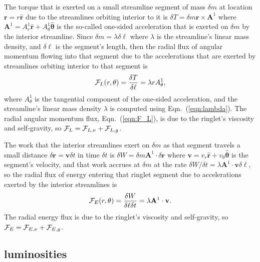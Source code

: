 \documentclass[preprint]{aastex62}
\begin{document}
The torque that is exerted on a small streamline segment of mass $\delta m$
at location $\mathbf{r}=r\hat{\mathbf{r}}$
due to the streamlines orbiting interior to it is $\delta T=\delta m\mathbf{r}\times\mathbf{A}^1$ where 
$\mathbf{A}^1=A^1_r\hat{\mathbf{r}} + A^1_\theta\hat{\boldsymbol\theta}$
is the so-called one-sided acceleration that is exerted on $\delta m$ by the interior streamline. 
Since $\delta m=\lambda\delta\ell$ where $\lambda$ is the streamline's linear mass density,
and $\delta\ell$ is the segment's length, then the radial flux of angular momentum flowing into
that segment due to the accelerations that are exerted by streamlines orbiting interior to that
segment is
\begin{equation}
    \label{eqn:F_L}
    {\cal F}_L(r, \theta) = \frac{\delta T}{\delta\ell} = \lambda r A^1_\theta,
\end{equation}
where $A^1_\theta$ is the tangential component of the one-sided acceleration,
and the streamline's linear mass density $\lambda$ is computed using Eqn.\ (\ref{eqn:lambda}).
The radial angular momentum flux, Eqn.\ (\ref{eqn:F_L}), is due to the ringlet's viscosity and self-gravity,
so ${\cal F}_L = {\cal F}_{L,\nu} + {\cal F}_{L,g}$. 

The work that the interior streamlines exert on $\delta m$ as that segment travels a small distance
$\delta\mathbf{r}=\mathbf{v}\delta t$ in time $\delta t$
is $\delta W=\delta m\mathbf{A}^1\cdot\delta\mathbf{r}$ where 
$\mathbf{v}=v_r\hat{\mathbf{r}} + v_\theta\hat{\boldsymbol\theta}$ is the segment's velocity, and
that work accrues at $\delta m$ at the rate 
$\delta W/\delta t=\lambda\mathbf{A}^1\cdot\mathbf{v}\delta\ell$,
so the radial flux of energy entering that ringlet segment due to accelerations
exerted by the interior streamlines is 
\begin{equation}
    \label{eqn:F_E}
    {\cal F}_E(r, \theta) = \frac{\delta W}{\delta\ell\delta t} = \lambda\mathbf{A}^1\cdot\mathbf{v}.
\end{equation}
The radial energy flux is due to the ringlet's viscosity and self-gravity, so
${\cal F}_E = {\cal F}_{E,\nu} + {\cal F}_{E,g}$. 

\subsection{luminosities}
\label{subsec:luminosities}
\end{document}
